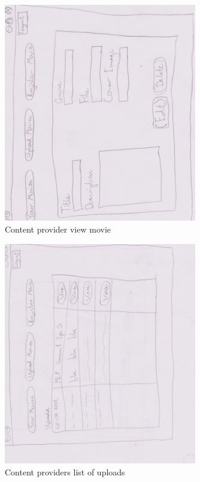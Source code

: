 \begin{figure}[!ht]
  \centering
    \includegraphics[width=0.75\textwidth]{Parts/Appendix/Images/PaperMockup/CPEditmovie}
  \caption{Content provider view movie}
  \label{fig:Appendix_GUI_sketches_ViewMovie}
\end{figure}

\begin{figure}[!ht]
  \centering
    \includegraphics[width=0.75\textwidth]{Parts/Appendix/Images/PaperMockup/CPMovieList}
  \caption{Content providers list of uploads}
  \label{fig:Appendix_GUI_sketches_ListofUploads}
\end{figure}

